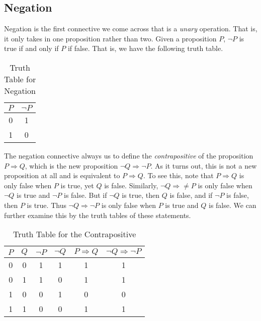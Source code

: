     \subsection{Negation}
        Negation is the first connective we come across that is a \textit{unary}
        operation. That is, it only takes in one proposition rather than two.
        Given a proposition $P$, $\neg{P}$ is true if and only if $P$ if false.
        That is, we have the following truth table.
        \begin{table}[H]
            \centering
            \captionsetup{type=table}
            \begin{tabular}{cc}
                $P$&$\neg{P}$\\
                \hline
                0&1\\
                1&0
            \end{tabular}
            \caption{Truth Table for Negation}
            \label{tab:Truth_Table_for_Negation}
        \end{table}
        The negation connective always us to define the
        \textit{contrapositive} of the proposition
        $P\Rightarrow{Q}$, which is the new proposition
        $\neg{Q}\Rightarrow\neg{P}$. As it turns out, this is not a new
        proposition at all and is equivalent to $P\Rightarrow{Q}$. To see this,
        note that $P\Rightarrow{Q}$ is only false when $P$ is true, yet $Q$ is
        false. Similarly, $\neg{Q}\Rightarrow\ne{P}$ is only false when
        $\neg{Q}$ is true and $\neg{P}$ is false. But if $\neg{Q}$ is true, then
        $Q$ is false, and if $\neg{P}$ is false, then $P$ is true. Thus
        $\neg{Q}\Rightarrow\neg{P}$ is only false when $P$ is true and $Q$ is
        false. We can further examine this by the truth tables of these
        statements.
        \begin{table}[H]
            \centering
            \captionsetup{type=table}
            \begin{tabular}{cccccc}
                $P$&$Q$&$\neg{P}$&$\neg{Q}$
                    &$P\Rightarrow{Q}$&$\neg{Q}\Rightarrow\neg{P}$\\
                \hline
                0&0&1&1&1&1\\
                0&1&1&0&1&1\\
                1&0&0&1&0&0\\
                1&1&0&0&1&1
            \end{tabular}
            \caption{Truth Table for the Contrapositive}
            \label{tab:Truth_Table_for_Contrapositive}
        \end{table}
